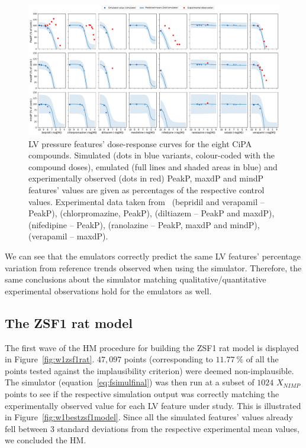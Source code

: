 \begin{figure}[ht!]
    \myfloatalign
    \includegraphics[width=\textwidth]{figures/chapter07/simulated_and_emulated_cipa_compounds_effects_on_lv_pressure_features_with_exp_data.pdf}
    \caption{LV pressure features' dose-response curves for the eight CiPA compounds. Simulated (dots in blue variants, colour-coded with the compound doses), emulated (full lines and shaded areas in blue) and experimentally observed (dots in red) PeakP, maxdP and mindP features' values are given as percentages of the respective control values. Experimental data taken from~\cite{Amsterdam:1988} (bepridil and verapamil -- PeakP), \cite{Langslet:1971} (chlorpromazine, PeakP), \cite{Koltai:1989} (diltiazem -- PeakP and maxdP), \cite{Saponara:2007} (nifedipine -- PeakP), \cite{Wang:2007} (ranolazine -- PeakP, maxdP and mindP), \cite{Kolar:1990} (verapamil -- maxdP).}
    \label{fig:LVfeatsalldrugsrespcurves}
\end{figure}

\vspace{0.2cm}
We can see that the emulators correctly predict the same LV features' percentage variation from reference trends observed when using the simulator. Therefore, the same conclusions about the simulator matching qualitative/quantitative experimental observations hold for the emulators as well.  


%
%
%
\subsection{The ZSF1 rat model}\label{sec:buildingzsf1model}
The first wave of the HM procedure for building the ZSF1 rat model is displayed in Figure~\ref{fig:w1zsf1rat}. $47,097$ points (corresponding to $\SI{11.77}{\percent}$ of all the points tested against the implausibility criterion) were deemed non-implausible. The simulator (equation~\eqref{eq:fsimulfinal}) was then run at a subset of $1024$ $X_{NIMP}$ points to see if the respective simulation output was correctly matching the experimentally observed value for each LV feature under study. This is illustrated in Figure~\ref{fig:w1bestzsf1model}. Since all the simulated features' values already fell between $3$ standard deviations from the respective experimental mean values, we concluded the HM.

